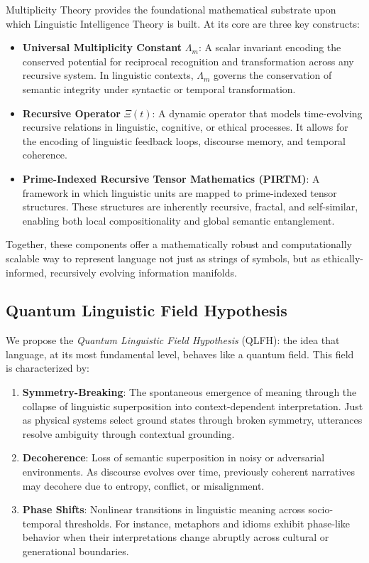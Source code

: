 \documentclass{article}
\theoremstyle{plain}
\theoremstyle{claimstyle}
\begin{document}
Multiplicity Theory provides the foundational mathematical substrate upon which Linguistic Intelligence Theory is built. At its core are three key constructs:

\begin{itemize}
    \item \textbf{Universal Multiplicity Constant} $\Lambda_m$: A scalar invariant encoding the conserved potential for reciprocal recognition and transformation across any recursive system. In linguistic contexts, $\Lambda_m$ governs the conservation of semantic integrity under syntactic or temporal transformation.
    
    \item \textbf{Recursive Operator} $\Xi(t)$: A dynamic operator that models time-evolving recursive relations in linguistic, cognitive, or ethical processes. It allows for the encoding of linguistic feedback loops, discourse memory, and temporal coherence.
    
    \item \textbf{Prime-Indexed Recursive Tensor Mathematics (PIRTM)}: A framework in which linguistic units are mapped to prime-indexed tensor structures. These structures are inherently recursive, fractal, and self-similar, enabling both local compositionality and global semantic entanglement.
\end{itemize}

Together, these components offer a mathematically robust and computationally scalable way to represent language not just as strings of symbols, but as ethically-informed, recursively evolving information manifolds.

\subsection{Quantum Linguistic Field Hypothesis}

We propose the \textit{Quantum Linguistic Field Hypothesis} (QLFH): the idea that language, at its most fundamental level, behaves like a quantum field. This field is characterized by:

\begin{enumerate}
    \item \textbf{Symmetry-Breaking}: The spontaneous emergence of meaning through the collapse of linguistic superposition into context-dependent interpretation. Just as physical systems select ground states through broken symmetry, utterances resolve ambiguity through contextual grounding.

    \item \textbf{Decoherence}: Loss of semantic superposition in noisy or adversarial environments. As discourse evolves over time, previously coherent narratives may decohere due to entropy, conflict, or misalignment.

    \item \textbf{Phase Shifts}: Nonlinear transitions in linguistic meaning across socio-temporal thresholds. For instance, metaphors and idioms exhibit phase-like behavior when their interpretations change abruptly across cultural or generational boundaries.
\end{enumerate}
\end{document}
